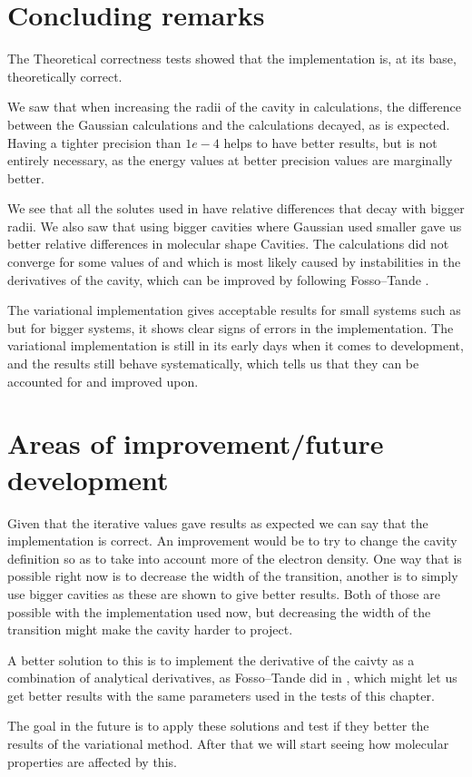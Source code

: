 \documentclass[../master_thesis.tex]{subfiles}
\begin{document}
\section{Concluding remarks}
The Theoretical correctness tests showed that the implementation is, at its base,
theoretically correct.

We saw that when increasing the radii of the cavity in calculations, the difference
between the Gaussian calculations and the \mrchem calculations decayed, as is
expected.
Having a tighter precision than $1e-4$ helps to have better results, but is not entirely
necessary, as the energy values at better precision values are marginally better.

We see that all the solutes used in \cite{Chipman2002} have relative differences that
decay with bigger radii. We also saw that using bigger \mrchem cavities where Gaussian
used smaller gave us better relative differences in molecular shape Cavities.
The \mrchem calculations did not converge for some values of  and 
which is most likely caused by instabilities in the derivatives of the cavity, which
can be improved by following Fosso--Tande \cite{FossoTande:2013ka}.

The variational implementation gives acceptable results for small systems such
as  but for bigger systems, it shows clear signs of errors in the implementation.
The variational implementation is still in its early days when it comes to development,
and the results still behave systematically, which tells us that they can be accounted for and
improved upon.

\section{Areas of improvement/future development}
Given that the iterative values gave results as expected we can say that the
implementation is correct. An improvement would be to try to change the cavity
definition so as to take into account more of the electron density. One way that is
possible right now is to decrease the width of the transition, another is to simply use
bigger cavities as these are shown to give better results. Both of those are possible
with the implementation used now, but decreasing the width of the transition might
make the cavity harder to project.

A better solution to this is to implement the derivative of the caivty as
a combination of analytical derivatives, as Fosso--Tande did in \cite{FossoTande:2013ka}, which
might let us get better results with the same parameters used in the tests of this chapter.

The goal in the future is to apply these solutions and test if they better the
results of the variational method. After that we will start seeing how molecular properties
are affected by this.



\biblio
\end{document}

